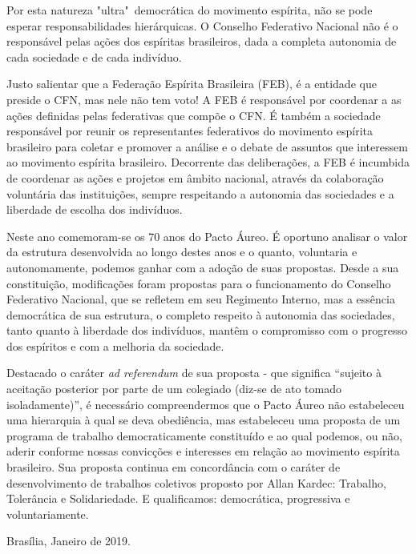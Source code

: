 Por esta natureza "ultra"\ democrática do movimento espírita, não se pode esperar responsabilidades hierárquicas. O Conselho Federativo Nacional não é o responsável pelas ações dos espíritas brasileiros, dada a completa autonomia de cada sociedade e de cada indivíduo. 

Justo salientar que a Federação Espírita Brasileira (FEB), é a entidade que preside o CFN, mas nele não tem voto! A FEB é responsável por coordenar a as ações definidas pelas federativas que compõe o CFN. É também a sociedade responsável por reunir os representantes federativos do movimento espírita brasileiro para coletar e promover a análise e o debate de assuntos que interessem ao movimento espírita brasileiro. Decorrente das deliberações, a FEB é incumbida de coordenar as ações e projetos em âmbito nacional, através da colaboração voluntária das instituições, sempre respeitando a autonomia das sociedades e a liberdade de escolha dos indivíduos. 

Neste ano comemoram-se os 70 anos do Pacto Áureo. É oportuno analisar o valor da estrutura desenvolvida ao longo destes anos e o quanto, voluntaria e autonomamente, podemos ganhar com a adoção de suas propostas. Desde a sua constituição, modificações foram propostas para o funcionamento do Conselho Federativo Nacional, que se refletem em seu Regimento Interno, mas a essência democrática de sua estrutura, o completo respeito à autonomia das sociedades, tanto quanto  à liberdade dos indivíduos,  mantêm o compromisso com o progresso dos espíritos e com a melhoria da sociedade.
 
Destacado o caráter \emph{ad referendum} de sua proposta - que significa ``sujeito à aceitação posterior por parte de um colegiado (diz-se de ato tomado isoladamente)'', é necessário compreendermos que o Pacto Áureo não estabeleceu uma hierarquia à qual se deva obediência, mas estabeleceu uma proposta de um programa de trabalho democraticamente constituído e ao qual podemos, ou não, aderir conforme nossas convicções e interesses em relação ao movimento espírita brasileiro. Sua proposta continua em concordância com o caráter de desenvolvimento de trabalhos coletivos proposto por Allan Kardec: Trabalho, Tolerância e Solidariedade. E qualificamos: democrática, progressiva e voluntariamente.  

\vspace{1,2cm}
\hspace{\fill} Brasília, Janeiro de 2019.